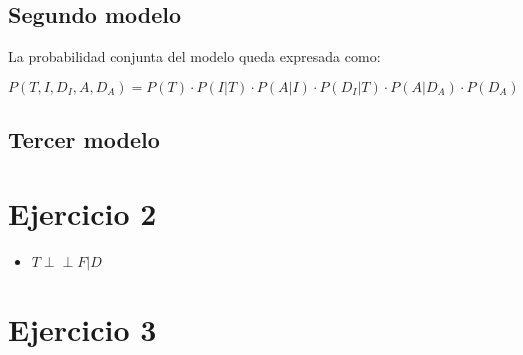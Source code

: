 \documentclass[letterpaper,12pt]{article}
\theoremstyle{definition}
\begin{document}
\subsection*{Segundo modelo}

La probabilidad conjunta del modelo queda expresada como:

\begin{equation}
  P(T,I,D_I,A,D_A) = P(T)\cdot P(I|T) \cdot P(A|I) \cdot P(D_I|T)\cdot P(A|D_A) \cdot P(D_A) 
\end{equation}

\subsection*{Tercer modelo}



\section*{Ejercicio 2}

\begin{itemize}
  \item \(T  \perp\!\!\!\perp F | D\)
\end{itemize}

\section*{Ejercicio 3}
\end{document}
